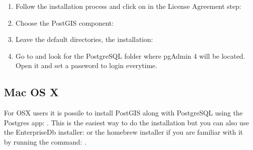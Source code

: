 \documentclass[a4paper,11pt,english]{sphinxmanual}
\begin{document}
\begin{enumerate}
\item {} 
Follow the installation process and click on  in the License Agreement step:

\noindent{}

\item {} 
Choose the PostGIS component:

\noindent{}

\item {} 
Leave the default directories,  the installation:

\noindent{}

\item {} 
Go to  and look for the PostgreSQL folder where pgAdmin 4 will be located. Open it and set a password to login everytime.

\end{enumerate}


\subsection{Mac OS X}
\label{\detokenize{installation_mac:mac-os-x}}\label{\detokenize{installation_mac:installation-mac}}\label{\detokenize{installation_mac::doc}}
For OSX users it is possile to install PostGIS along with PostgreSQL using the Postgres app: . This is the easiest way to do the installation but you can also use the EnterpriseDb installer:  or the homebrew installer if you are familiar with it by running the command: .
\end{document}
